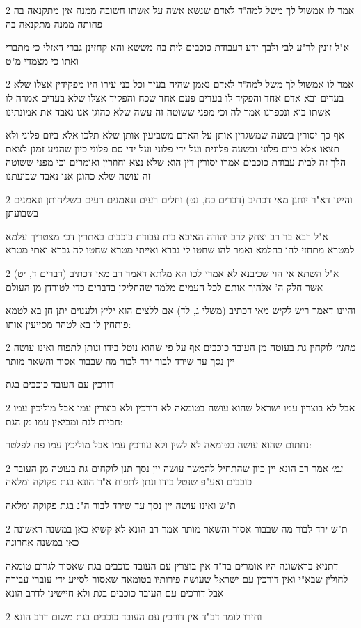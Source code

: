 \documentclass[12pt, openany]{book}
\newcommand{\sethebfont}{
\fontsize{10.5pt}{21.0pt} \selectfont
}
\newcommand{\twocol}[1]{
	{\sethebfont \begin{multicols}{2}
			#1
	\end{multicols}}	
}
\begin{document}
\twocol{אמר לו אמשול לך משל למה"ד לאדם שנשא אשה על אשתו חשובה ממנה אין מתקנאה בה פחותה ממנה מתקנאה בה
\par א"ל זונין לר"ע לבי ולבך ידע דעבודת כוכבים לית בה מששא והא קחזינן גברי דאזלי כי מתברי ואתו כי מצמדי מ"ט}
\twocol{אמר לו אמשול לך משל למה"ד לאדם נאמן שהיה בעיר וכל בני עירו היו מפקידין אצלו שלא בעדים ובא אדם אחד והפקיד לו בעדים פעם אחד שכח והפקיד אצלו שלא בעדים אמרה לו אשתו בוא ונכפרנו אמר לה וכי מפני ששוטה זה עשה שלא כהוגן אנו נאבד את אמונתינו
\par אף כך יסורין בשעה שמשגרין אותן על האדם משביעין אותן שלא תלכו אלא ביום פלוני ולא תצאו אלא ביום פלוני ובשעה פלונית ועל ידי פלוני ועל ידי סם פלוני כיון שהגיע זמנן לצאת הלך זה לבית עבודת כוכבים אמרו יסורין דין הוא שלא נצא וחוזרין ואומרים וכי מפני ששוטה זה עושה שלא כהוגן אנו נאבד שבועתנו}
\twocol{והיינו דא"ר יוחנן מאי דכתיב (דברים כח, נט) וחלים רעים ונאמנים רעים בשליחותן ונאמנים בשבועתן
\par א"ל רבא בר רב יצחק לרב יהודה האיכא בית עבודת כוכבים באתרין דכי מצטריך עלמא למטרא מתחזי להו בחלמא ואמר להו שחטו לי גברא ואייתי מטרא שחטו לה גברא ואתי מטרא}
\twocol{א"ל השתא אי הוי שכיבנא לא אמרי לכו הא מלתא דאמר רב מאי דכתיב (דברים ד, יט) אשר חלק ה' אלהיך אותם לכל העמים מלמד שהחליקן בדברים כדי לטורדן מן העולם
\par והיינו דאמר ריש לקיש מאי דכתיב (משלי ג, לד) אם ללצים הוא יליץ ולענוים יתן חן בא לטמא פותחין לו בא לטהר מסייעין אותו:}
\twocol{{\large\emph{מתני׳}} לוקחין גת בעוטה מן העובד כוכבים אף על פי שהוא נוטל בידו ונותן לתפוח ואינו עושה יין נסך עד שירד לבור ירד לבור מה שבבור אסור והשאר מותר
\par דורכין עם העובד כוכבים בגת}
\twocol{אבל לא בוצרין עמו ישראל שהוא עושה בטומאה לא דורכין ולא בוצרין עמו אבל מוליכין עמו חביות לגת ומביאין עמו מן הגת:
\par נחתום שהוא עושה בטומאה לא לשין ולא עורכין עמו אבל מוליכין עמו פת לפלטר:}
\twocol{{\large\emph{גמ׳}} אמר רב הונא יין כיון שהתחיל להמשך עושה יין נסך תנן לוקחים גת בעוטה מן העובד כוכבים ואע"פ שנטל בידו ונתן לתפוח א"ר הונא בגת פקוקה ומלאה
\par ת"ש ואינו עושה יין נסך עד שירד לבור ה"נ בגת פקוקה ומלאה}
\twocol{ת"ש ירד לבור מה שבבור אסור והשאר מותר אמר רב הונא לא קשיא כאן במשנה ראשונה כאן במשנה אחרונה
\par דתניא בראשונה היו אומרים בד"ד אין בוצרין עם העובד כוכבים בגת שאסור לגרום טומאה לחולין שבא"י ואין דורכין עם ישראל שעושה פירותיו בטומאה שאסור לסייע ידי עוברי עבירה אבל דורכים עם העובד כוכבים בגת ולא חיישינן לדרב הונא}
\twocol{וחזרו לומר דב"ד אין דורכין עם העובד כוכבים בגת משום דרב הונא}
\end{document}
